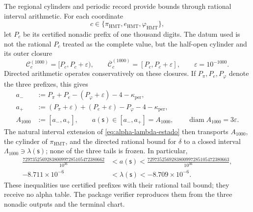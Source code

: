 The regional cylinders and periodic record provide bounds through
rational interval arithmetic. For each coordinate
\[
 c\in\{\pi_{\mathrm{HMT}},e_{\mathrm{HMT}},\varphi_{\mathrm{HMT}}\},
\]
let \(P_c\) be its certified nonadic prefix of one thousand digits. The datum
used is not the rational \(P_c\) treated as the complete value, but the
half-open cylinder and its outer closure
\[
 \mathcal C_c^{(1000)}=[P_c,P_c+\varepsilon),
 \qquad
 \overline{\mathcal C}_c^{(1000)}=[P_c,P_c+\varepsilon],
 \qquad \varepsilon=10^{-1000}.
\]
Directed arithmetic operates conservatively on these closures. If
\(P_\pi,P_e,P_\varphi\) denote the three prefixes, this gives
\begin{equation}
\begin{aligned}
 a_-&:=P_\pi+P_e-(P_\varphi+\varepsilon)-4-
       \kappa_{\mathrm{per}},\\
 a_+&:=(P_\pi+\varepsilon)+(P_e+\varepsilon)-P_\varphi-4-
       \kappa_{\mathrm{per}},\\
 A_{1000}&:=[a_-,a_+],
 \qquad a(\mathsf s)\in[a_-,a_+]=A_{1000},
 \qquad \operatorname{diam}A_{1000}=3\varepsilon.
\end{aligned}
\label{eq:alpha-propagacion-colas-rev08}
\end{equation}
The natural interval extension of
\eqref{eq:alpha-lambda-estado} then transports \(A_{1000}\), the cylinder
of \(\pi_{\mathrm{HMT}}\), and the directed rational bound for \(\delta\) to a
closed interval \(\Lambda_{1000}\ni\lambda(\mathsf s)\); none of the three
tails is frozen. In particular,
\begin{equation}
\begin{aligned}
 \frac{7297352569283800997285105472380662}{10^{36}}
 &<a(\mathsf s)<
 \frac{7297352569283800997285105472380663}{10^{36}},\\
 -8.711\mathbin{\times}10^{-6}
 &<\lambda(\mathsf s)<-8.709\mathbin{\times}10^{-6}.
\end{aligned}
 \label{eq:alpha-cotas-precoordenada-lambda}
\end{equation}
These inequalities use certified prefixes with their rational tail bound;
they receive no alpha table. The package verifier reproduces them
from the three nonadic outputs and the terminal chart.


